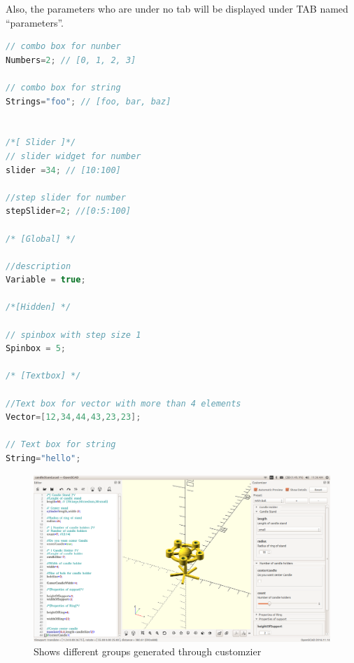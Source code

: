 \documentclass[12pt,includeheadfoot,a4paper]{report}
\begin{document}
Also, the parameters who are under no tab will be displayed under TAB named “parameters”.
\begin{lstlisting}[language=c++]
// combo box for nunber
Numbers=2; // [0, 1, 2, 3]

// combo box for string
Strings="foo"; // [foo, bar, baz]


/*[ Slider ]*/
// slider widget for number
slider =34; // [10:100]

//step slider for number
stepSlider=2; //[0:5:100]

/* [Global] */

//description
Variable = true;

/*[Hidden] */

// spinbox with step size 1
Spinbox = 5;

/* [Textbox] */

//Text box for vector with more than 4 elements
Vector=[12,34,44,43,23,23];

// Text box for string
String="hello";

\end{lstlisting}

\begin{figure}
	\centering \includegraphics[width=\linewidth]{images/output/6.png}
	\caption{Shows different groups generated through customzier}
	\label{fig:5}
\end{figure}


\end{document}
